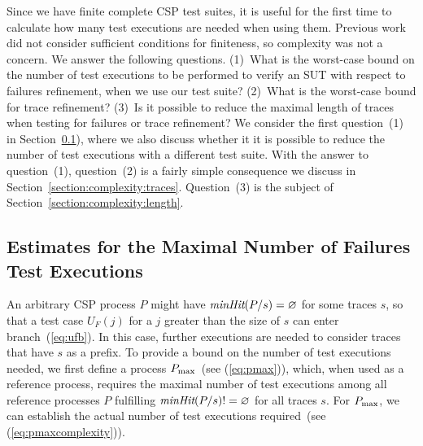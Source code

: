 Since we have finite complete CSP test suites, it is useful for the first
time to calculate how many test executions are needed when using them.
Previous work did not consider sufficient conditions for finiteness, so
complexity was not a concern. We answer the following questions. (1)~What is
the worst-case bound on the number of test executions to be performed to
verify an SUT with respect to failures refinement, when we use our test
suite? (2)~What is the worst-case bound for trace refinement? (3)~Is it
possible to reduce the maximal length of traces when testing for failures or
trace refinement? We consider the first question~(1) in
Section~\ref{section:complexity:failures}), where we also discuss whether it
it is possible to reduce the number of test executions with a different test
suite.  With the answer to question~(1), question~(2) is a fairly simple
consequence we discuss in Section~\ref{section:complexity:traces}.
Question~(3) is the subject of Section~\ref{section:complexity:length}.

\subsection{Estimates for the Maximal Number of Failures Test Executions}
\label{section:complexity:failures}

An arbitrary CSP process $P$ might have $\text{\it minHit}(P/s) = \varnothing$ for
some traces $s$, so that a test case $U_F(j)$ for a $j$ greater than the size
of $s$ can enter branch~(\ref{eq:ufb}). In this case, further executions are
needed to consider traces that have $s$ as a prefix.  To provide a bound on
the number of test executions needed, we first define a process $P_\text{max}$~(see
(\ref{eq:pmax})), which, when used as a reference process, requires the
maximal number of test executions among all reference processes $P$
fulfilling $\text{\it minHit}(P/s) != \varnothing$ for all traces $s$. For $P_\text{max}$, we
can establish the actual number of test executions required~(see
(\ref{eq:pmaxcomplexity})).

